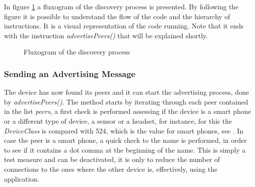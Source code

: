 In figure \ref{fig:discflux} a fluxogram of the discovery process is presented. By following the figure it is possible to understand the flow of the code and the hierarchy of instructions. It is a visual representation of the code running. Note that it ends with the instruction \textit{advertisePeers()} that will be explained shortly.

\begin{figure}[ht]
   \noindent{}
	\caption{\label{fig:discflux} Fluxogram of the discovery process}
\end{figure}

\subsubsection{Sending an Advertising Message}
\label{subsubsec:sendadv}

The device has now found its peers and it can start the advertising process, done by \textit{advertisePeers()}. The method starts by iterating through each peer contained in the list \textit{peers}, a first check is performed assessing if the device is a smart phone or a different type of device, a sensor or a headset, for instance, for this the \textit{DeviceClass} is compared with 524, which is the value for smart phones, see \cite{btclass}. 
In case the peer is a smart phone, a quick check to the name is performed, in order to see if it contains a dot comma at the beginning of the name. This is simply a test measure and can be deactivated, it is only to reduce the number of connections to the ones where the other device is, effectively, using the application.

